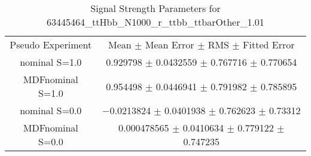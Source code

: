 \begin{table}
\centering
\caption{Signal Strength Parameters for 63445464\_ttHbb\_N1000\_r\_ttbb\_ttbarOther\_1.01}
\begin{tabular}{cc}
\toprule
Pseudo Experiment & Mean $\pm$ Mean Error $\pm$ RMS $\pm$ Fitted Error\\
nominal S=1.0 & \num{0.929798} $\pm$ \num{0.0432559} $\pm$ \num{0.767716} $\pm$ \num{0.770654}\\
MDFnominal S=1.0 & \num{0.954498} $\pm$ \num{0.0446941} $\pm$ \num{0.791982} $\pm$ \num{0.785895}\\
nominal S=0.0 & \num{-0.0213824} $\pm$ \num{0.0401938} $\pm$ \num{0.762623} $\pm$ \num{0.73312}\\
MDFnominal S=0.0 & \num{0.000478565} $\pm$ \num{0.0410634} $\pm$ \num{0.779122} $\pm$ \num{0.747235}\\
\bottomrule
\end{tabular}
\end{table}